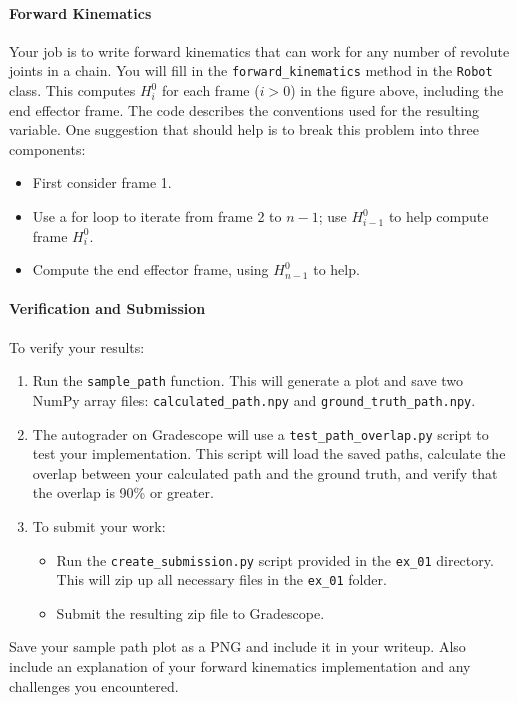 \documentclass{16384_doc} %
\begin{document}
\begin{questions}
    \paragraph{Forward Kinematics} Your job is to write forward kinematics that
    can work for any number of revolute joints in a chain. You will fill in
    the \verb!forward_kinematics! method in the \verb!Robot! class. This computes
    $H_i^0$ for each frame ($i > 0$) in the figure above, including the end
    effector frame.
    The code describes the conventions used for the resulting variable.
    One suggestion that should help is to break this problem into three
    components:
    \begin{itemize}
      \item First consider frame 1.
      \item Use a for loop to iterate from frame 2 to $n-1$; use 
      $H_{i-1}^0$ to help compute frame $H_i^0$.
      \item Compute the end effector frame, using $H_{n-1}^0$ to help.
    \end{itemize}
    \paragraph{Verification and Submission} To verify your results:
    \begin{enumerate}
      \item Run the \verb!sample_path! function. This will generate a plot and save
            two NumPy array files: \verb!calculated_path.npy! and \verb!ground_truth_path.npy!.
      \item The autograder on Gradescope will use a \verb!test_path_overlap.py! script to
            test your implementation. This script will load the saved paths, calculate
            the overlap between your calculated path and the ground truth, and verify
            that the overlap is 90\% or greater.
      \item To submit your work:
        \begin{itemize}
          \item Run the \verb!create_submission.py! script provided in the \verb!ex_01! directory.
                This will zip up all necessary files in the \verb!ex_01! folder.
          \item Submit the resulting zip file to Gradescope.
        \end{itemize}
    \end{enumerate}
    Save your sample path plot as a PNG and include it in your writeup. Also include
    an explanation of your forward kinematics implementation and any challenges you
    encountered.
\end{questions}
\end{document}
